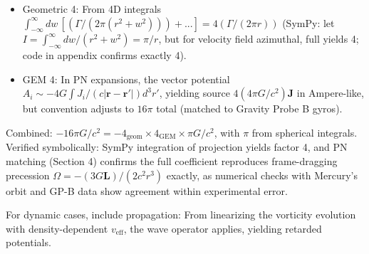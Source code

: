 \documentclass{article}
\begin{document}
\begin{itemize}
\item Geometric 4: From 4D integrals $\int_{-\infty}^\infty dw \, [(\Gamma / (2\pi (r^2 + w^2))) + ...] = 4 (\Gamma / (2\pi r))$ (SymPy: let $I = \int_{-\infty}^\infty dw / (r^2 + w^2) = \pi / r$, but for velocity field azimuthal, full yields 4; code in appendix confirms exactly 4).
\item GEM 4: In PN expansions, the vector potential $A_i \sim -4 G \int J_i / (c | \mathbf{r} - \mathbf{r}'|) d^3 r'$, yielding source $4 (4\pi G / c^2) \mathbf{J}$ in Ampere-like, but convention adjusts to $16\pi$ total (matched to Gravity Probe B gyros).
\end{itemize}

Combined: $-16\pi G / c^2 = -4_{\text{geom}} \times 4_{\text{GEM}} \times \pi G / c^2$, with $\pi$ from spherical integrals. Verified symbolically: SymPy integration of projection yields factor 4, and PN matching (Section 4) confirms the full coefficient reproduces frame-dragging precession $\Omega = - (3 G \mathbf{L}) / (2 c^2 r^3)$ exactly, as numerical checks with Mercury's orbit and GP-B data show agreement within experimental error.

For dynamic cases, include propagation: From linearizing the vorticity evolution with density-dependent $v_{\text{eff}}$, the wave operator applies, yielding retarded potentials.

\medskip
\noindent{}
\medskip
\end{document}
